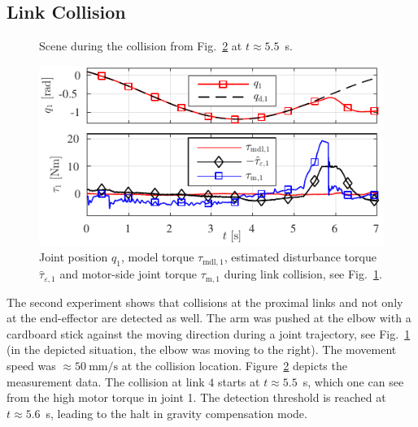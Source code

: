 \subsection{Link Collision}
\label{sec:CollDet_Link}
%
\begin{figure}
\centering
\parbox{\columnwidth}{

}
\caption{Scene during the collision from Fig.~\ref{fig:StickCollisionSummary} at $t\approx5.5$~s.}
\label{fig:StickCollisionPhoto}
\SkipBeforePicture
\end{figure}
%
\begin{figure}
\centering
\parbox{\columnwidth}{
\includegraphics{figures/CollDetStick/CollDetStickIROS.pdf}
}
\vspace*{-1ex}
\caption{Joint position $q_1$, model torque $\tau_{\mathrm{mdl},1}$, estimated disturbance torque $\hat{\tau}_{\varepsilon,1}$ and motor-side joint torque $\tau_{\mathrm{m},1}$ during link collision, see Fig.~\ref{fig:StickCollisionPhoto}.}
\label{fig:StickCollisionSummary}
\SkipBeforeText
\end{figure}
%
The second experiment shows that collisions at the proximal links and not only at the end-effector are detected as well.
The arm was pushed at the elbow with a cardboard stick against the moving direction during a joint trajectory, see Fig.~\ref{fig:StickCollisionPhoto} (in the depicted situation, the elbow was moving to the right).
The movement speed was $\approx50~\mathrm{mm/s}$ at the collision location.
Figure~\ref{fig:StickCollisionSummary} depicts the measurement data. The collision at link $4$ starts at $t\approx5.5$~s, which one can see from the high motor torque in joint 1.
The detection threshold is reached at $t\approx5.6$~s, leading to the halt in gravity compensation mode.

